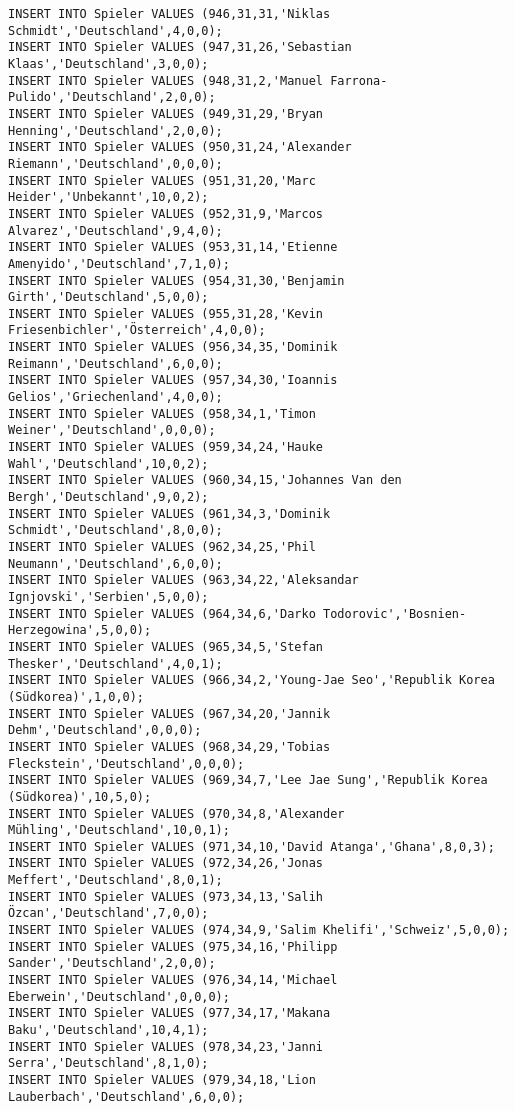 \documentclass{lehramt-informatik-aufgabe}
\begin{document}
\begin{verbatim}
INSERT INTO Spieler VALUES (946,31,31,'Niklas Schmidt','Deutschland',4,0,0);
INSERT INTO Spieler VALUES (947,31,26,'Sebastian Klaas','Deutschland',3,0,0);
INSERT INTO Spieler VALUES (948,31,2,'Manuel Farrona-Pulido','Deutschland',2,0,0);
INSERT INTO Spieler VALUES (949,31,29,'Bryan Henning','Deutschland',2,0,0);
INSERT INTO Spieler VALUES (950,31,24,'Alexander Riemann','Deutschland',0,0,0);
INSERT INTO Spieler VALUES (951,31,20,'Marc Heider','Unbekannt',10,0,2);
INSERT INTO Spieler VALUES (952,31,9,'Marcos Alvarez','Deutschland',9,4,0);
INSERT INTO Spieler VALUES (953,31,14,'Etienne Amenyido','Deutschland',7,1,0);
INSERT INTO Spieler VALUES (954,31,30,'Benjamin Girth','Deutschland',5,0,0);
INSERT INTO Spieler VALUES (955,31,28,'Kevin Friesenbichler','Österreich',4,0,0);
INSERT INTO Spieler VALUES (956,34,35,'Dominik Reimann','Deutschland',6,0,0);
INSERT INTO Spieler VALUES (957,34,30,'Ioannis Gelios','Griechenland',4,0,0);
INSERT INTO Spieler VALUES (958,34,1,'Timon Weiner','Deutschland',0,0,0);
INSERT INTO Spieler VALUES (959,34,24,'Hauke Wahl','Deutschland',10,0,2);
INSERT INTO Spieler VALUES (960,34,15,'Johannes Van den Bergh','Deutschland',9,0,2);
INSERT INTO Spieler VALUES (961,34,3,'Dominik Schmidt','Deutschland',8,0,0);
INSERT INTO Spieler VALUES (962,34,25,'Phil Neumann','Deutschland',6,0,0);
INSERT INTO Spieler VALUES (963,34,22,'Aleksandar Ignjovski','Serbien',5,0,0);
INSERT INTO Spieler VALUES (964,34,6,'Darko Todorovic','Bosnien-Herzegowina',5,0,0);
INSERT INTO Spieler VALUES (965,34,5,'Stefan Thesker','Deutschland',4,0,1);
INSERT INTO Spieler VALUES (966,34,2,'Young-Jae Seo','Republik Korea (Südkorea)',1,0,0);
INSERT INTO Spieler VALUES (967,34,20,'Jannik Dehm','Deutschland',0,0,0);
INSERT INTO Spieler VALUES (968,34,29,'Tobias Fleckstein','Deutschland',0,0,0);
INSERT INTO Spieler VALUES (969,34,7,'Lee Jae Sung','Republik Korea (Südkorea)',10,5,0);
INSERT INTO Spieler VALUES (970,34,8,'Alexander Mühling','Deutschland',10,0,1);
INSERT INTO Spieler VALUES (971,34,10,'David Atanga','Ghana',8,0,3);
INSERT INTO Spieler VALUES (972,34,26,'Jonas Meffert','Deutschland',8,0,1);
INSERT INTO Spieler VALUES (973,34,13,'Salih Özcan','Deutschland',7,0,0);
INSERT INTO Spieler VALUES (974,34,9,'Salim Khelifi','Schweiz',5,0,0);
INSERT INTO Spieler VALUES (975,34,16,'Philipp Sander','Deutschland',2,0,0);
INSERT INTO Spieler VALUES (976,34,14,'Michael Eberwein','Deutschland',0,0,0);
INSERT INTO Spieler VALUES (977,34,17,'Makana Baku','Deutschland',10,4,1);
INSERT INTO Spieler VALUES (978,34,23,'Janni Serra','Deutschland',8,1,0);
INSERT INTO Spieler VALUES (979,34,18,'Lion Lauberbach','Deutschland',6,0,0);

\end{verbatim}
\end{document}
